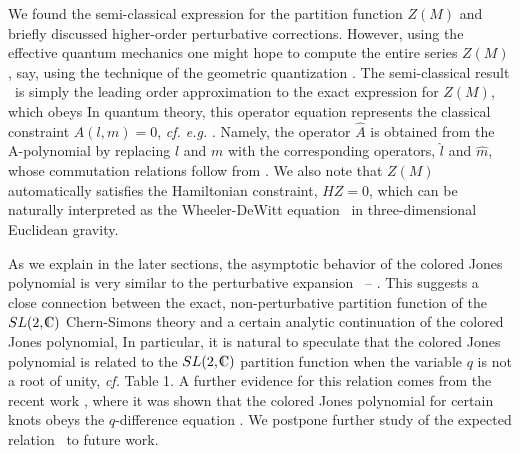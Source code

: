 We found the semi-classical expression for the partition function
$Z(M)$ and briefly discussed higher-order perturbative corrections.
However, using the effective quantum mechanics one
might hope to compute the entire series $Z(M)$,
say, using the technique of the geometric
quantization .
The semi-classical result \semiclassz\ is simply the leading order
approximation to the exact expression for $Z(M)$, which obeys
%
\eqn{}
%
In quantum theory, this operator equation represents
the classical constraint $A(l,m)=0$, {\it cf. e.g.} \lpqfeight.
Namely, the operator $\hat A$ is obtained from the A-polynomial
by replacing $l$ and $m$ with the corresponding operators,
$\hat l$ and $\hat m$, whose commutation relations follow from \uvpb.
We also note that $Z(M)$ automatically satisfies
the Hamiltonian constraint, $\hat H Z = 0$,
which can be naturally interpreted as the Wheeler-DeWitt
equation \wdweq\ in three-dimensional Euclidean gravity.


%

As we explain in the later sections, the asymptotic behavior
of the colored Jones polynomial is very similar to
the perturbative expansion \semiclasszm\ -- \pertz.
This suggests a close connection between the exact,
non-perturbative partition function of the $SL(2,\IC)$ Chern-Simons
theory and a certain analytic continuation of the colored Jones polynomial,
%
\eqn{}
%
In particular, it is natural to speculate that the colored
Jones polynomial is related to the $SL(2,\IC)$ partition function
when the variable $q$ is not a root of unity, {\it cf.} Table 1.
A further evidence for this relation comes from the recent
work \Stavros, where it was shown that the colored Jones polynomial
for certain knots obeys the $q$-difference equation \azquantum.
We postpone further study of the expected relation \zmguess\ to future work.

